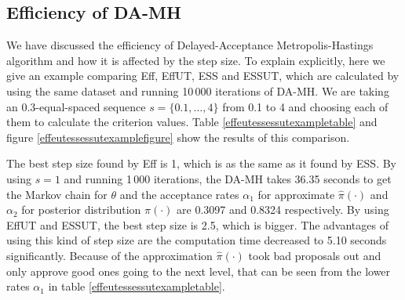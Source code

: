 \subsection{Efficiency of DA-MH}

We have discussed the efficiency of Delayed-Acceptance Metropolis-Hastings algorithm and how it is affected by the step size. To explain explicitly, here we give an example comparing Eff, EffUT, ESS and ESSUT, which are calculated by using the same dataset and running 10\,000 iterations of DA-MH. We are taking an 0.3-equal-spaced sequence $s=\{0.1,\dots,4\}$ from 0.1 to 4 and choosing each of them to calculate the criterion values. Table \ref{effeutessessutexampletable} and figure \ref{effeutessessutexamplefigure} show the results of this comparison. 

The best step size found by Eff is 1, which is as the same as it found by ESS. By using $s=1$ and running 1\,000 iterations, the DA-MH takes 36.35 seconds to get the Markov chain for $\theta$ and the acceptance rates $\alpha_1$ for approximate $\hat{\pi}(\cdot)$ and $\alpha_2$ for posterior distribution $\pi(\cdot)$ are 0.3097 and 0.8324 respectively. By using EffUT and ESSUT, the best step size is 2.5, which is bigger. The advantages of using this kind of step size are the computation time decreased to 5.10 seconds significantly. Because of the approximation $\hat{\pi}(\cdot)$ took bad proposals out and only approve good ones going to the next level, that can be seen from the lower rates $\alpha_1$ in table \ref{effeutessessutexampletable}. 



